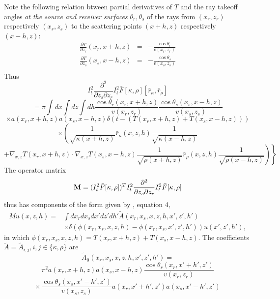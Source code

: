 Note the following relation btween
partial derivatives of $T$ and the ray takeoff angles {\em at the
  source and receiver surfaces}
$\theta_r,\theta_s$ of the rays from $(x_r,z_r)$ respectively
$(x_s,z_s)$ to the scattering points $(x+h,z)$ respectively $(x-h,z)$:
\begin{eqnarray}
\frac{\partial T}{\partial z_r}(x_r,x+h,z)  &=& -\frac{\cos 
  \theta_r}{v(x_r,z_r)} \nonumber \\
\label{eqn:dtdxr}
\frac{\partial T}{\partial z_s}(x_s,x-h,z)  &=& -\frac{\cos 
  \theta_s}{v(x_s,z_s)}\\
\end{eqnarray}
Thus
\[
I_t^2\frac{\partial^2}{\partial z_s \partial z_r}
I_t^2\bar{F}[\kappa,\rho][\bar{r}_{\kappa},\bar{r}_{\rho}]
\]
\[
=\pi\int dx \int dz \int dh \frac{\cos \theta_r(x_r,x+h,z)}{v(x_r,z_r)}
\frac{\cos \theta_s(x_s,x-h,z)}{v(x_s,z_s)}
\]
\[
\times a(x_r,x+h,z) a(x_s,x-h,z) 
\delta(t-(T(x_r,x+h,z)+T(x_s,x-h,z)))  
\]
\[
\times \left(\frac{1}{\sqrt{\kappa(x+h,z)}} \bar{r}_{\kappa}(x,z,h) \frac{1}{\sqrt{\kappa(x-h,z)}}
\right. 
\]
\begin{equation}
\label{eqn:intrep2dsr}
+\left. \left. 
   \nabla_{x,z}  T(x_r,x+h,z) \cdot \nabla_{x,z} T(x_s,x-h,z) 
\frac{1}{\sqrt{\rho(x+h,z)}}  \bar{r}_{\rho}(x,z,h) \frac{1}{\sqrt{\rho(x-h,z)}}
\right)\right\}
\end{equation}
The operator matrix 
\begin{equation}
\label{eqn:dwnop}
{\bf M} = (I_t^2\bar{F}[\kappa,\rho])^T
I_t^2\frac{\partial^2}{\partial z_s \partial z_r}I_t^2\bar{F}[\kappa,\rho]
\end{equation}
thus has components of the form given by
\cite{HouSymes:17}, equation 4,
\begin{equation}
\begin{aligned}
\label{eqn:grt2d}
M u(x,z,h) =& \int dx_r dx_s dx' dz' dh' \tilde{A}(x_r,x_s,x,z,h,x',z',h')\\
&\times \delta(\phi(x_r,x_s,x,z,h) - \phi(x_r,x_s,x',z',h')) u(x',z',h'),
\end{aligned}
\end{equation}
in which $\phi(x_r,x_s,x,z,h) = T(x_r,x+h,z) + T(x_s,x-h,z)$. The
coefficients $\tilde{A} = \tilde{A}_{i,j}, i,j \in \{\kappa, \rho\}$ are
\[
\tilde{A}_0(x_r,x_s,x,z,h,x',z',h')=
\]
\[
\pi^2 a(x_r,x+h,z) 
a(x_s,x-h,z) \frac{\cos \theta_r(x_r,x'+h',z')}{v(x_r,z_r)}
\]
\begin{equation}
\label{eqn:grt2dcoeff1}
\times \, \frac{\cos \theta_s(x_s,x'-h',z')}{v(x_s,z_s)} a(x_r,x'+h',z')a(x_s,x'-h',z')
\end{equation}
